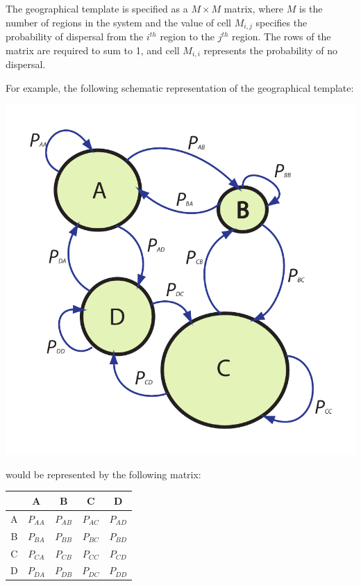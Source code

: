 \documentclass[11pt]{article}
\begin{document}
The geographical template is specified as a $M \times M$ matrix, where $M$ is the number of regions in the system and the value of cell $M_{i,j}$ specifies the probability of dispersal from the $i^{th}$ region to the $j^{th}$ region.
The rows of the matrix are required to sum to 1, and cell $M_{i,i}$ represents the probability of no dispersal.

For example, the following schematic representation of the geographical template:

\begin{center}
	\includegraphics[scale=0.3]{generic-geographical-template.pdf}
\end{center}

would be represented by the following matrix:

\begin{center}
    \begin{tabular}{c|cccc}
          & A & B & C & D\\
		\hline	             
        A & $P_{AA}$ & $P_{AB}$ & $P_{AC}$ & $P_{AD}$ \\
        B & $P_{BA}$ & $P_{BB}$ & $P_{BC}$ & $P_{BD}$ \\
        C & $P_{CA}$ & $P_{CB}$ & $P_{CC}$ & $P_{CD}$ \\
        D & $P_{DA}$ & $P_{DB}$ & $P_{DC}$ & $P_{DD}$ \\
    \end{tabular}
\end{center}		        
\end{document}

